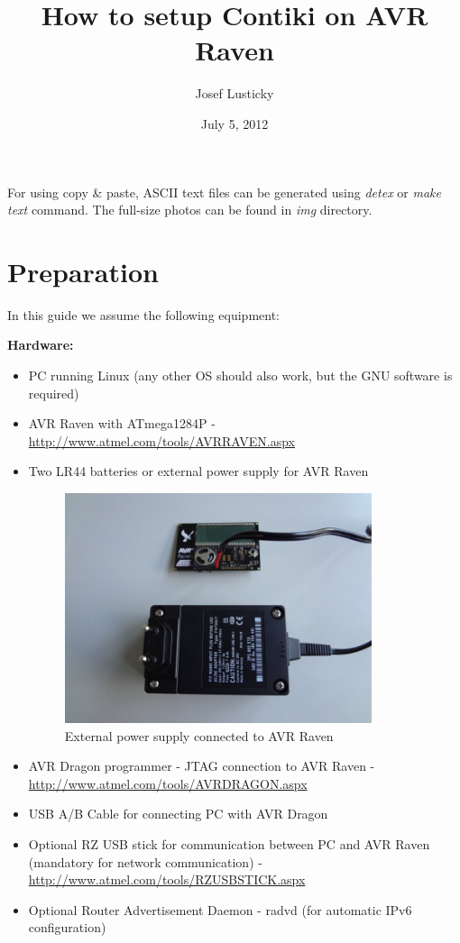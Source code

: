 \documentclass{article}
\begin{document}
\title{How to setup Contiki on AVR Raven}
\author{Josef Lusticky}
\date{July 5, 2012}

\maketitle

For using copy \& paste, ASCII text files can be generated
using {\it{detex}} or {\it{make text}} command.
The full-size photos can be found in {\it{img}} directory.

\section{Preparation}
In this guide we assume the following equipment:

\vspace{0.2cm}

{\textbf{Hardware:}}
\begin{itemize}
	\item PC running Linux (any other OS should also work, but the GNU software is required)
	\item AVR Raven with ATmega1284P - \url{http://www.atmel.com/tools/AVRRAVEN.aspx}
	\item Two LR44 batteries or external power supply for AVR Raven
\begin{figure}[H]
  \centering
  \includegraphics[width=9cm,keepaspectratio]{smallfig/DSC02594-small.jpeg}
  \caption{External power supply connected to AVR Raven}
\end{figure}
	\item AVR Dragon programmer - JTAG connection to AVR Raven - \url{http://www.atmel.com/tools/AVRDRAGON.aspx}
	\item USB A/B Cable for connecting PC with AVR Dragon
	\item Optional RZ USB stick for communication between PC and AVR Raven
	(mandatory for network communication) - \url{http://www.atmel.com/tools/RZUSBSTICK.aspx}
	\item Optional Router Advertisement Daemon - radvd (for automatic IPv6 configuration)
\end{itemize}
\end{document}
